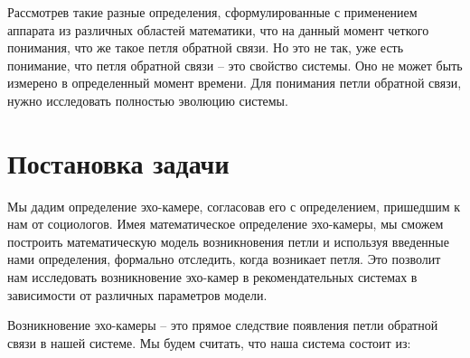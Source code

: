 \documentclass{article}
\begin{document}
Рассмотрев такие разные определения, сформулированные с применением аппарата из различных областей математики, что на данный момент четкого понимания, что же такое петля обратной связи. Но это не так, уже есть понимание, что петля обратной связи – это свойство системы. Оно не может быть измерено в определенный момент времени. Для понимания петли обратной связи, нужно исследовать полностью эволюцию системы. 


\section{Постановка задачи}

Мы дадим определение эхо-камере, согласовав его с определением, пришедшим к нам от социологов. Имея математическое определение эхо-камеры, мы сможем построить математическую модель возникновения петли и используя введенные нами определения, формально отследить, когда возникает петля. Это позволит нам исследовать возникновение эхо-камер в рекомендательных системах в зависимости от различных параметров модели. 


Возникновение эхо-камеры – это прямое следствие появления петли обратной связи в нашей системе. Мы будем считать, что наша система состоит из: 
\end{document}
